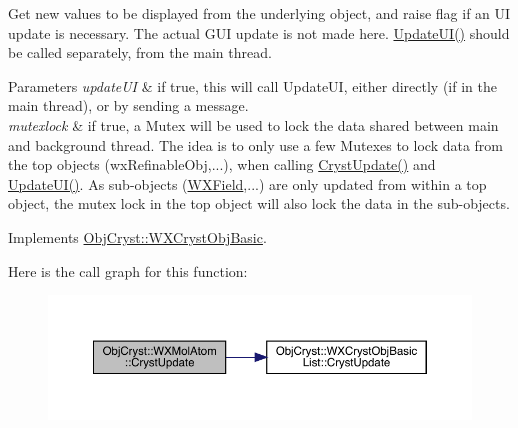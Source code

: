 Get new values to be displayed from the underlying object, and raise flag if an UI update is necessary. The actual G\+UI update is not made here. \mbox{\hyperlink{class_obj_cryst_1_1_w_x_mol_atom_a85a5d3b73dfd84fbba194f9eac7a40d5}{Update\+U\+I()}} should be called separately, from the main thread.


\begin{DoxyParams}{Parameters}
{\em update\+UI} & if true, this will call Update\+UI, either directly (if in the main thread), or by sending a message. \\
\hline
{\em mutexlock} & if true, a Mutex will be used to lock the data shared between main and background thread. The idea is to only use a few Mutexes to lock data from the top objects (wx\+Refinable\+Obj,...), when calling \mbox{\hyperlink{class_obj_cryst_1_1_w_x_mol_atom_a2b12f264ad4893b1f0b8381abe5b5742}{Cryst\+Update()}} and \mbox{\hyperlink{class_obj_cryst_1_1_w_x_mol_atom_a85a5d3b73dfd84fbba194f9eac7a40d5}{Update\+U\+I()}}. As sub-\/objects (\mbox{\hyperlink{class_obj_cryst_1_1_w_x_field}{W\+X\+Field}},...) are only updated from within a top object, the mutex lock in the top object will also lock the data in the sub-\/objects. \\
\hline
\end{DoxyParams}


Implements \mbox{\hyperlink{class_obj_cryst_1_1_w_x_cryst_obj_basic_a7ac00ae2ae28f1a6fa26e6fa571186b6}{Obj\+Cryst\+::\+W\+X\+Cryst\+Obj\+Basic}}.

Here is the call graph for this function\+:
\nopagebreak
\begin{figure}[H]
\begin{center}
\leavevmode
\includegraphics[width=350pt]{class_obj_cryst_1_1_w_x_mol_atom_a2b12f264ad4893b1f0b8381abe5b5742_cgraph}
\end{center}
\end{figure}
\mbox{\label{class_obj_cryst_1_1_w_x_mol_atom_a85a5d3b73dfd84fbba194f9eac7a40d5}} 
